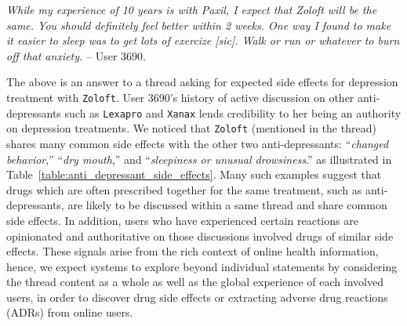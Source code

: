 \documentclass{bmcart}
\begin{document}
{\footnotesize
{\it While my experience of 10 years is with Paxil, I expect that Zoloft will be the same. You should definitely feel better within 2 weeks. One way I found to make it easier to sleep was to get lots of exercize [sic]. Walk or run or whatever to burn off that anxiety.} -- User 3690.
}

The above is an answer to a thread asking for expected side effects for
depression treatment with {\tt Zoloft}. User 3690's history of active
discussion on other anti-depressants such as {\tt Lexapro} and {\tt Xanax} lends credibility to her being an authority on depression treatments. We noticed that {\tt Zoloft} (mentioned in the thread) shares many common side effects with the other two anti-depressants: ``\textit{changed behavior},'' ``\textit{dry mouth},'' and ``\textit{sleepiness or unusual
drowsiness}.'' as illustrated in 
Table~\ref{table:anti_depressant_side_effects}. Many such examples suggest that drugs which are often prescribed together for the same treatment, such as anti-depressants, are likely to be discussed within a same thread and share common side effects. 
In addition, users who have experienced certain reactions are opinionated and authoritative on those discussions involved drugs of similar side effects. These signals arise from the rich context of online health information, hence, we expect systems to explore beyond individual statements by considering the thread content as a whole as well as the global experience of each involved users, in order to discover drug side effects or extracting 
adverse drug reactions (ADRs) from online users.
\end{document}
